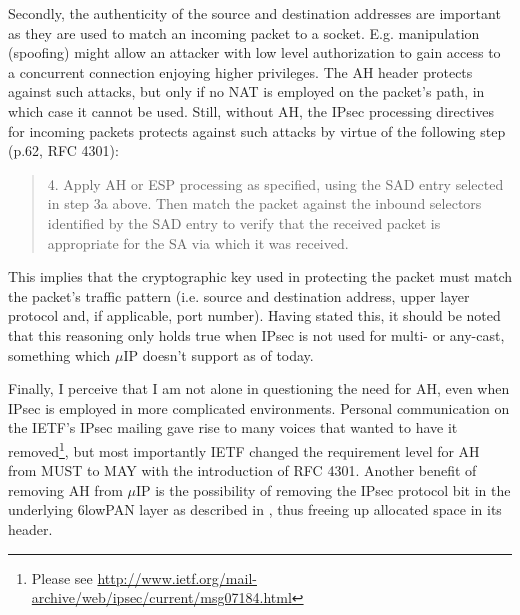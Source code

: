 \documentclass[final,a4paper,twoside,11pt,onecolumn]{report}
\begin{document}
Secondly, the authenticity of the source and destination addresses are important as they are used to match an incoming packet to a socket. E.g. manipulation (spoofing) might allow an attacker with low level authorization to gain access to a concurrent connection enjoying higher privileges. The AH header protects against such attacks, but only if no NAT is employed on the packet's path, in which case it cannot be used. Still, without AH, the IPsec processing directives for incoming packets protects against such attacks by virtue of the following step (p.62, RFC 4301):


\begin{quotation}
4.  Apply AH or ESP processing as specified, using the SAD entry
    selected in step 3a above. Then match the packet against the
    inbound selectors identified by the SAD entry to verify that the
    received packet is appropriate for the SA via which it was
    received.
\end{quotation}

This implies that the cryptographic key used in protecting the packet must match the packet's traffic pattern (i.e. source and destination address, upper layer protocol and, if applicable, port number). Having stated this, it should be noted that this reasoning only holds true when IPsec is not used for multi- or any-cast, something which $\mu$IP doesn't support as of today.

Finally, I perceive that I am not alone in questioning the need for AH, even when IPsec is employed in more complicated environments. Personal communication on the IETF's IPsec mailing gave rise to many voices that wanted to have it removed\footnote{Please see \url{http://www.ietf.org/mail-archive/web/ipsec/current/msg07184.html}}, but most importantly IETF changed the requirement level for AH from MUST to MAY with the introduction of RFC 4301. Another benefit of removing AH from $\mu$IP is the possibility of removing the IPsec protocol bit in the underlying 6lowPAN layer as described in \cite{raza2011securing}, thus freeing up allocated space in its header.



% 
% 
% 
\end{document}
